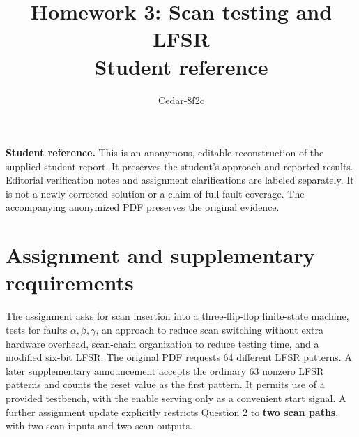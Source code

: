\documentclass[11pt,a4paper]{article}
\title{Homework 3: Scan testing and LFSR\\Student reference}
\author{Cedar-8f2c}
\date{}
\newcommand{\reference}{\noindent\textbf{Student reference.} This is an anonymous, editable reconstruction of the supplied student report. It preserves the student's approach and reported results. Editorial verification notes and assignment clarifications are labeled separately. It is not a newly corrected solution or a claim of full fault coverage. The accompanying anonymized PDF preserves the original evidence.\par}
\begin{document}
\maketitle
\reference

\section{Assignment and supplementary requirements}
The assignment asks for scan insertion into a three-flip-flop finite-state machine, tests for faults $\alpha,\beta,\gamma$, an approach to reduce scan switching without extra hardware overhead, scan-chain organization to reduce testing time, and a modified six-bit LFSR.
The original PDF requests 64 different LFSR patterns. A later supplementary announcement accepts the ordinary 63 nonzero LFSR patterns and counts the reset value as the first pattern. It permits use of a provided testbench, with the enable serving only as a convenient start signal.
A further assignment update explicitly restricts Question 2 to \textbf{two scan paths}, with two scan inputs and two scan outputs.
\end{document}
